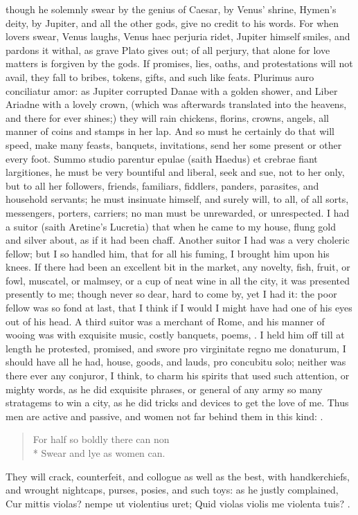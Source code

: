 {though he solemnly swear by the genius of Caesar, by Venus' shrine,
Hymen's deity, by Jupiter, and all the other gods, give no credit to
his words. For when lovers swear, Venus laughs, Venus haec perjuria
ridet, Jupiter himself smiles, and pardons it withal, as grave
Plato gives out; of all perjury, that alone for love matters is
forgiven by the gods. If promises, lies, oaths, and protestations will
not avail, they fall to bribes, tokens, gifts, and such like feats.
Plurimus auro conciliatur amor: as Jupiter corrupted Danae with a
golden shower, and Liber Ariadne with a lovely crown, (which was
afterwards translated into the heavens, and there for ever shines;)
they will rain chickens, florins, crowns, angels, all manner of coins
and stamps in her lap. And so must he certainly do that will speed,
make many feasts, banquets, invitations, send her some present or other
every foot. Summo studio parentur epulae (saith Haedus) et
crebrae fiant largitiones, he must be very bountiful and liberal, seek
and sue, not to her only, but to all her followers, friends, familiars,
fiddlers, panders, parasites, and household servants; he must insinuate
himself, and surely will, to all, of all sorts, messengers, porters,
carriers; no man must be unrewarded, or unrespected. I had a suitor
(saith Aretine's Lucretia) that when he came to my house, flung
gold and silver about, as if it had been chaff. Another suitor I had
was a very choleric fellow; but I so handled him, that for all his
fuming, I brought him upon his knees. If there had been an excellent
bit in the market, any novelty, fish, fruit, or fowl, muscatel, or
malmsey, or a cup of neat wine in all the city, it was presented
presently to me; though never so dear, hard to come by, yet I had it:
the poor fellow was so fond at last, that I think if I would I might
have had one of his eyes out of his head. A third suitor was a merchant
of Rome, and his manner of wooing was with exquisite music,
costly banquets, poems, \etc{}. I held him off till at length he protested,
promised, and swore pro virginitate regno me donaturum, I should have
all he had, house, goods, and lauds, pro concubitu solo; neither
was there ever any conjuror, I think, to charm his spirits that used
such attention, or mighty words, as he did exquisite phrases, or
general of any army so many stratagems to win a city, as he did tricks
and devices to get the love of me. Thus men are active and passive, and
women not far behind them in this kind: .
%
{\gothfont
\begin{verse}
For half so boldly there can non\\*
Swear and lye as women can.
\end{verse}
}
%
They will crack, counterfeit, and collogue as well as the best,
with handkerchiefs, and wrought nightcaps, purses, posies, and such
toys: as he justly complained,
Cur mittis violas? nempe ut violentius uret;
Quid violas violis me violenta tuis? \etc{}.

}
